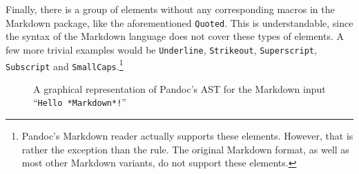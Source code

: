 \documentclass[
  digital,     %
  oneside,     %
  nosansbold,  %
  nocolorbold, %
  lof,         %
  nolot,       %
]{fithesis4}
\begin{document}
Finally, there is a group of elements without any corresponding macros in the Markdown package, like the aforementioned \texttt{Quoted}. This is understandable, since the syntax of the Markdown language does not cover these types of elements. A few more trivial examples would be \texttt{Underline}, \texttt{Strikeout}, \texttt{Superscript}, \texttt{Subscript} and \texttt{SmallCaps}.\footnote{Pandoc's Markdown reader actually supports these elements. However, that is rather the exception than the rule. The original Markdown format, as well as most other Markdown variants, do not support these elements.}

\begin{figure}
  \centering
  \caption{A graphical representation of Pandoc's AST for the Markdown input ``\texttt{Hello *Markdown*!}''}
  \label{fig:pandoc-ast}
\end{figure}
\end{document}
